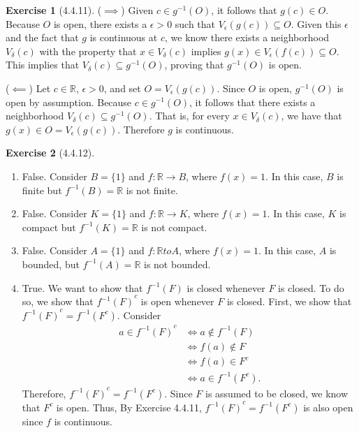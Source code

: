 \documentclass{amsart}
\theoremstyle{definition}
\newtheorem{exercise}{Exercise}
\newcommand{\R}{\mathbb{R}}
\begin{document}
\begin{exercise}[4.4.11]
  ($\implies$) Given $c \in g^{-1}(O)$, it follows that $g(c) \in O$. Because
  $O$ is open, there exists a $\epsilon > 0$ such that $V_\epsilon(g(c))
  \subseteq O$. Given this $\epsilon$ and the fact that $g$ is continuous at
  $c$, we know there exists a neighborhood $V_\delta(c)$ with the property that
  $x \in V_\delta(c)$ implies $g(x) \in V_\epsilon(f(c)) \subseteq O$. This
  implies that $V_\delta(c) \subseteq g^{-1}(O)$, proving that $g^{-1}(O)$ is
  open.

  ($\impliedby$) Let $c \in \R$, $\epsilon > 0$, and set $O = V_\epsilon(g(c))$.
  Since $O$ is open, $g^{-1}(O)$ is open by assumption. Because $c \in
  g^{-1}(O)$, it follows that there exists a neighborhood $V_\delta(c) \subseteq
  g^{-1}(O)$. That is, for every $x \in V_\delta(c)$, we have that $g(x) \in O =
  V_\epsilon(g(c))$. Therefore $g$ is continuous.
\end{exercise}

\begin{exercise}[4.4.12]
  \begin{enumerate}[label={(\alph*)}]
    \item False. Consider $B = \{1\}$ and $f : \R \to B$, where $f(x) = 1$. In
      this case, $B$ is finite but $f^{-1}(B) = \R$ is not finite.
    \item False. Consider $K = \{1\}$ and $f : \R \to K$, where $f(x) = 1$. In
      this case, $K$ is compact but $f^{-1}(K) = \R$ is not compact.
    \item False. Consider $A = \{1\}$ and $f : \R to A$, where $f(x) = 1$. In
      this case, $A$ is bounded, but $f^{-1}(A) = \R$ is not bounded.
    \item True. We want to show that $f^{-1}(F)$ is closed whenever $F$ is
      closed. To do so, we show that ${f^{-1}(F)}^c$ is open whenever $F$ is
      closed. First, we show that ${f^{-1}(F)}^c = f^{-1}(F^c)$. Consider
      \begin{align*}
        a \in {f^{-1}(F)}^c &\iff a \notin f^{-1}(F) \\
        &\iff f(a) \notin F \\
        &\iff f(a) \in F^c \\
        &\iff a \in f^{-1}(F^c).
      \end{align*}
      Therefore, ${f^{-1}(F)}^c = f^{-1}(F^c)$. Since $F$ is assumed to be
      closed, we know that $F^c$ is open. Thus, By Exercise 4.4.11,
      ${f^{-1}(F)}^c = f^{-1}(F^c)$ is also open since $f$ is continuous.
  \end{enumerate}
\end{exercise}
\end{document}
